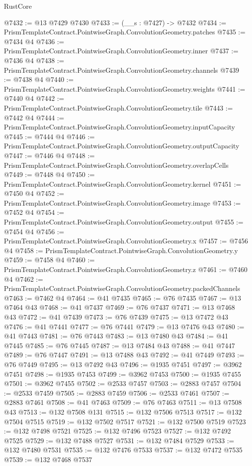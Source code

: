 \begin{lexlean}{RustCore}
\begin{coremodule}
@7432 := @13 @7429 @7430
@7433 := (__s : @7427) -> @7432
@7434 := PrismTemplateContract.PointwiseGraph.ConvolutionGeometry.patches
@7435 := @7434 @4
@7436 := PrismTemplateContract.PointwiseGraph.ConvolutionGeometry.inner
@7437 := @7436 @4
@7438 := PrismTemplateContract.PointwiseGraph.ConvolutionGeometry.channels
@7439 := @7438 @4
@7440 := PrismTemplateContract.PointwiseGraph.ConvolutionGeometry.weights
@7441 := @7440 @4
@7442 := PrismTemplateContract.PointwiseGraph.ConvolutionGeometry.tile
@7443 := @7442 @4
@7444 := PrismTemplateContract.PointwiseGraph.ConvolutionGeometry.inputCapacity
@7445 := @7444 @4
@7446 := PrismTemplateContract.PointwiseGraph.ConvolutionGeometry.outputCapacity
@7447 := @7446 @4
@7448 := PrismTemplateContract.PointwiseGraph.ConvolutionGeometry.overlapCells
@7449 := @7448 @4
@7450 := PrismTemplateContract.PointwiseGraph.ConvolutionGeometry.kernel
@7451 := @7450 @4
@7452 := PrismTemplateContract.PointwiseGraph.ConvolutionGeometry.image
@7453 := @7452 @4
@7454 := PrismTemplateContract.PointwiseGraph.ConvolutionGeometry.output
@7455 := @7454 @4
@7456 := PrismTemplateContract.PointwiseGraph.ConvolutionGeometry.x
@7457 := @7456 @4
@7458 := PrismTemplateContract.PointwiseGraph.ConvolutionGeometry.y
@7459 := @7458 @4
@7460 := PrismTemplateContract.PointwiseGraph.ConvolutionGeometry.z
@7461 := @7460 @4
@7462 := PrismTemplateContract.PointwiseGraph.ConvolutionGeometry.packedChannels
@7463 := @7462 @4
@7464 := @41 @7435
@7465 := @76 @7435
@7467 := @13 @7464 @43
@7468 := @41 @7437
@7469 := @76 @7437
@7471 := @13 @7468 @43
@7472 := @41 @7439
@7473 := @76 @7439
@7475 := @13 @7472 @43
@7476 := @41 @7441
@7477 := @76 @7441
@7479 := @13 @7476 @43
@7480 := @41 @7443
@7481 := @76 @7443
@7483 := @13 @7480 @43
@7484 := @41 @7445
@7485 := @76 @7445
@7487 := @13 @7484 @43
@7488 := @41 @7447
@7489 := @76 @7447
@7491 := @13 @7488 @43
@7492 := @41 @7449
@7493 := @76 @7449
@7495 := @13 @7492 @43
@7496 := @1935 @7451
@7497 := @3962 @7451
@7498 := @1935 @7453
@7499 := @3962 @7453
@7500 := @1935 @7455
@7501 := @3962 @7455
@7502 := @2533 @7457
@7503 := @2883 @7457
@7504 := @2533 @7459
@7505 := @2883 @7459
@7506 := @2533 @7461
@7507 := @2883 @7461
@7508 := @41 @7463
@7509 := @76 @7463
@7511 := @13 @7508 @43
@7513 := @132 @7508 @131
@7515 := @132 @7506 @7513
@7517 := @132 @7504 @7515
@7519 := @132 @7502 @7517
@7521 := @132 @7500 @7519
@7523 := @132 @7498 @7521
@7525 := @132 @7496 @7523
@7527 := @132 @7492 @7525
@7529 := @132 @7488 @7527
@7531 := @132 @7484 @7529
@7533 := @132 @7480 @7531
@7535 := @132 @7476 @7533
@7537 := @132 @7472 @7535
@7539 := @132 @7468 @7537

\end{coremodule}
\end{lexlean}
